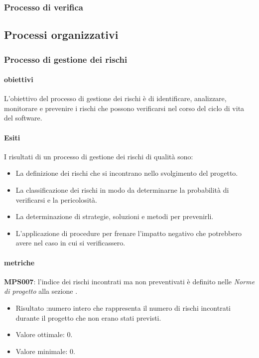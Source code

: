 \documentclass[../piano-di-qualifica.tex]{subfiles}
\begin{document}
\subsubsection{Processo di verifica}%
\label{subs:processo_di_verifica}

\subsection{Processi organizzativi}%
\label{sub:processi_organizzativi}

\subsubsection{Processo di gestione dei rischi}%
\label{sub:processo_di_gestione_dei_rischi}

\paragraph{obiettivi}
\label{par:obiettivi}

L'obiettivo del processo di gestione dei rischi è di identificare, analizzare, monitorare e prevenire i rischi che possono verificarsi nel corso del ciclo di vita del software.

\paragraph{Esiti}
\label{par:esiti}

I risultati di un processo di gestione dei rischi di qualità sono:
\begin{itemize}
	\item La definizione dei rischi che si incontrano nello svolgimento del progetto.
	\item La classificazione dei rischi in modo da determinarne la probabilità di verificarsi e la pericolosità.
    \item La determinazione di strategie, soluzioni e metodi per prevenirli.
    \item L'applicazione di procedure per frenare l'impatto negativo che potrebbero avere nel caso in cui si verificassero. 
\end{itemize}

\paragraph{metriche}
\label{par:metriche}

\textbf{MPS007}: l'indice dei rischi incontrati ma non preventivati è definito nelle \textit{Norme di progetto} alla sezione .
\begin{itemize}
	\item Risultato :numero intero che rappresenta il numero di rischi incontrati durante il progetto che non erano stati previsti.
	\item Valore ottimale: 0.
	\item Valore minimale: 0.
\end{itemize}
\end{document}
